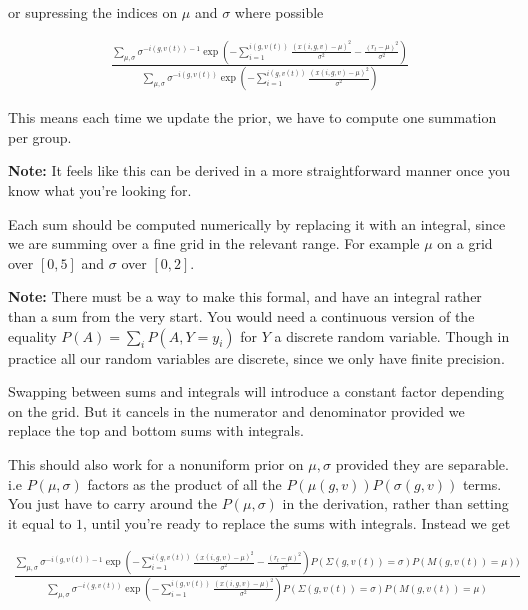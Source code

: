 \documentclass[12pt]{article}
\theoremstyle{definition}
\newcommand{\si}{\ensuremath{\sigma}}
\newcommand{\0}{\ensuremath{\varnothing}}
\newcommand{\1}{{\bf 1}}
\begin{document}
  or supressing the indices on $\mu$ and $\si$ where possible 
  
  
  
  \begin{align}  \displaystyle \frac{\sum_{\mu,\si}    \si   ^{-i(g,v(t))-1}\exp \left( -\sum_{i=1}^{i(g,v(t))} \frac{(x(i,g,v) - \mu )^2}{\si^2 } - \frac{(r_t -   \mu )^2}{  \si^2  } \right)  }{\sum_{\mu,\si}    \si   ^{-i(g,v(t))}\exp \left( -\sum_{i=1}^{i(g,v(t))} \frac{(x(i,g,v) - \mu)^2}{\si^2}\right) }\label{finalupdate}
  \end{align}
  
  This means each time we update the prior, we have to compute one summation per group. 
  
  
  {\bf Note:} It feels like this can be derived in a  more straightforward manner once you know what you're looking for. 
  
  Each sum should be computed numerically by replacing it with an integral, since we are summing over a fine grid in the relevant range. For example $\mu$ on a grid over $[0,5]$ and $\si$ over $[0,2]$.  
  
  {\bf Note:} There must be a way to make this formal, and have an integral rather than a sum  from the very start. You would need a continuous version of the equality $P(A) = \sum_i P(A, Y=y_i)$ for $Y$ a discrete random variable. Though in practice all our random variables are discrete, since we only have finite precision. 
   
  Swapping between sums and integrals will introduce a constant factor depending on the grid. But it cancels in the numerator and denominator provided we replace the top and bottom sums with integrals. 
  
  This should also work for a nonuniform prior on $\mu,\si$ provided they are separable. i.e $P(\mu,\si)$ factors as the product of all the $P(\mu(g,v))P(\si(g,v))$ terms. You just have to carry around the $P(\mu, \si) $ in the derivation, rather than setting it equal to $1$, until you're ready to replace the sums with   integrals. Instead we get
  
  \begin{align}  \displaystyle \frac{\sum_{\mu,\si}    \si   ^{-i(g,v(t))-1}\exp \left( -\sum_{i=1}^{i(g,v(t))} \frac{(x(i,g,v) - \mu )^2}{\si^2 } - \frac{(r_t -   \mu )^2}{  \si^2  } \right)  P(\Sigma(g,v(t)) = \si) P(M(g,v(t)) = \mu))}{\sum_{\mu,\si}    \si   ^{-i(g,v(t))}\exp \left( -\sum_{i=1}^{i(g,v(t))} \frac{(x(i,g,v) - \mu)^2}{\si^2}\right) P(\Sigma(g,v(t)) = \si) P(M(g,v(t)) = \mu)} 
  \end{align}
  
\end{document}
